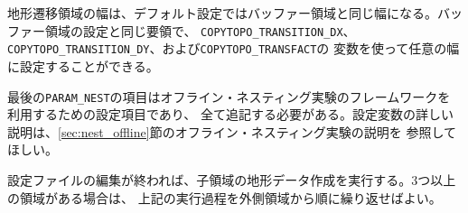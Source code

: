 地形遷移領域の幅は、デフォルト設定ではバッファー領域と同じ幅になる。バッファー領域の設定と同じ要領で、
\verb|COPYTOPO_TRANSITION_DX|、\verb|COPYTOPO_TRANSITION_DY|、および\verb|COPYTOPO_TRANSFACT|の
変数を使って任意の幅に設定することができる。

最後の\verb|PARAM_NEST|の項目はオフライン・ネスティング実験のフレームワークを利用するための設定項目であり、
全て追記する必要がある。設定変数の詳しい説明は、\ref{sec:nest_offline}節のオフライン・ネスティング実験の説明を
参照してほしい。

設定ファイルの編集が終われば、子領域の地形データ作成を実行する。3つ以上の領域がある場合は、
上記の実行過程を外側領域から順に繰り返せばよい。



